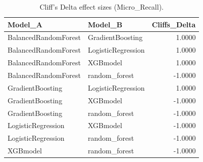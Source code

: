 \begin{table}[t]
\centering
\begin{tabular}{llr}
\toprule
Model_A & Model_B & Cliffs_Delta \\
\midrule
BalancedRandomForest & GradientBoosting & 1.0000 \\
BalancedRandomForest & LogisticRegression & 1.0000 \\
BalancedRandomForest & XGBmodel & 1.0000 \\
BalancedRandomForest & random_forest & -1.0000 \\
GradientBoosting & LogisticRegression & 1.0000 \\
GradientBoosting & XGBmodel & -1.0000 \\
GradientBoosting & random_forest & -1.0000 \\
LogisticRegression & XGBmodel & -1.0000 \\
LogisticRegression & random_forest & -1.0000 \\
XGBmodel & random_forest & -1.0000 \\
\bottomrule
\end{tabular}
\caption{Cliff's Delta effect sizes (Micro_Recall).}
\label{tab:cliffs_Micro_Recall}
\end{table}